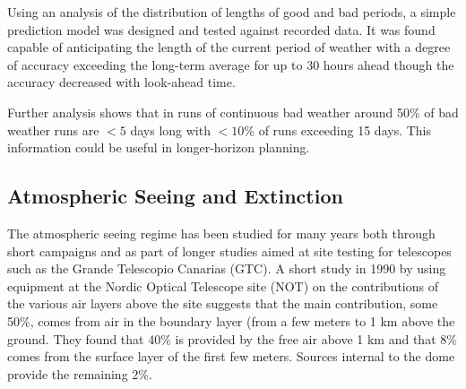 {{Using an analysis of the distribution of lengths of good and bad periods, a simple prediction model was designed and tested against recorded data. It was found capable of anticipating the length of the current period of weather with a degree of accuracy exceeding the long-term average for up to 30 hours ahead though the accuracy decreased with look-ahead time. 

Further analysis shows that in runs of continuous bad weather around 50\% of bad weather runs are $<5$ days long with $<10$\% of runs exceeding 15 days. This information could be useful in longer-horizon planning.



\subsection{Atmospheric Seeing and Extinction}  
\label{sect:sub_atmoseeing}
The atmospheric seeing regime has been studied for many years both through short campaigns and as part of longer studies aimed at site testing for telescopes such as the Grande Telescopio Canarias (GTC).
 A short study in 1990 by \citet{vernin92optical} using equipment at the Nordic Optical Telescope site (NOT) on the contributions of the various air layers above the site suggests that the main contribution, some 50\%, comes from air in the boundary layer (from a few meters to 1 km above the ground. They found that 40\% is provided by the free air above 1 km and that 8\% comes from the surface layer of the first few meters. Sources internal to the dome provide the remaining 2\%.

}}
